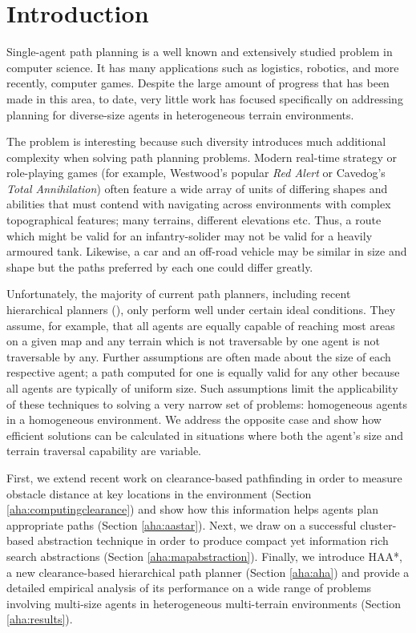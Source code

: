 \section{Introduction}
Single-agent path planning is a well known and extensively studied problem in computer science.
It has many applications such as logistics, robotics, and more recently, computer games. 
Despite the large amount of progress that has been made in this area, to date, very little work has focused specifically on addressing planning for diverse-size agents in heterogeneous terrain environments. 
\par \indent
The problem is interesting because such diversity introduces much additional complexity when solving path planning problems.
Modern real-time strategy or role-playing games (for example, Westwood's popular \emph{Red Alert} or Cavedog's \emph{Total Annihilation}) often feature a wide array of units of differing shapes and abilities that must contend with navigating across environments with complex topographical features; many terrains, different elevations etc. 
Thus, a route which might be valid for an infantry-solider may not be valid for a heavily armoured tank. 
Likewise, a car and an off-road vehicle may be similar in size and shape but the paths preferred by each one could differ greatly. 
\par \indent
Unfortunately, the majority of current path planners, including recent hierarchical planners (\cite{botea04,sturtevant05,demyen07,geraerts07}), only perform well under certain ideal conditions. 
They assume, for example, that all agents are equally capable of reaching most areas on a given map and any terrain which is not traversable by one agent is not traversable by any. 
Further assumptions are often made about the size of each respective agent; a path computed for one is equally valid for any other because all agents are typically of uniform size. 
Such assumptions limit the applicability of these techniques to solving a very narrow set of problems: homogeneous agents in a homogeneous environment. 
We address the opposite case and show how efficient solutions can be calculated in situations where both the agent's size and terrain traversal capability are variable. 
\par \indent
First, we extend recent work on clearance-based pathfinding \cite{geraerts07} in order to measure obstacle distance at key locations in the environment (Section \ref{aha:computingclearance}) and show how this information helps agents plan appropriate paths (Section \ref{aha:aastar}). 
Next, we draw on a successful cluster-based abstraction technique \cite{botea04} in order to produce compact yet information rich search abstractions (Section \ref{aha:mapabstraction}). 
Finally, we introduce HAA*, a new clearance-based hierarchical path planner (Section \ref{aha:aha}) and provide a detailed empirical analysis of its performance on a wide range of problems involving multi-size agents in heterogeneous multi-terrain environments (Section \ref{aha:results}).

